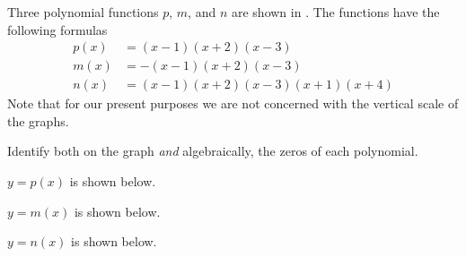 \begin{exercises}
\begin{problem}
\begin{multicols}{3}
\begin{subproblem}
\begin{shortsolution}
		\end{shortsolution}
	\end{subproblem}
\end{multicols}
\end{problem}
\begin{problem}
Three polynomial functions $p$, $m$, and $n$ are shown in .
The functions have the following formulas
\begin{align*}
	p(x) & = (x-1)(x+2)(x-3)           \\
	m(x) & = -(x-1)(x+2)(x-3)          \\
	n(x) & = (x-1)(x+2)(x-3)(x+1)(x+4)
\end{align*}
Note that for our present purposes we are not concerned with the vertical scale of the graphs.
\begin{subproblem}
	Identify both on the graph {\em and} algebraically, the zeros of each polynomial.
	\begin{shortsolution}
		$y=p(x)$ is shown below.


		$y=m(x)$ is shown below.


		$y=n(x)$ is shown below.



\end{shortsolution}
\end{subproblem}
\end{problem}
\end{exercises}
